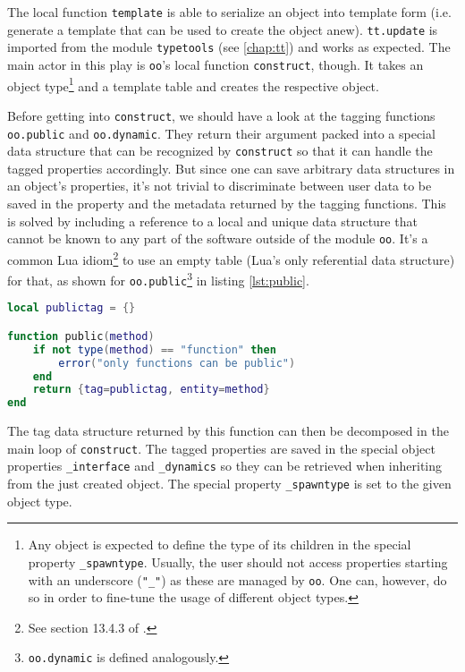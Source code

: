 The local function \texttt{template} is able to serialize an object into template form (i.e. generate a template that can be used to create the object anew). \texttt{tt.update} is imported from the module \texttt{typetools} (see \ref{chap:tt}) and works as expected. The main actor in this play is \texttt{oo}'s local function \texttt{construct}, though. It takes an object type\footnote{Any object is expected to define the type of its children in the special property \texttt{\_spawntype}. Usually, the user should not access properties starting with an underscore (\texttt{"\_"}) as these are managed by \texttt{oo}. One can, however, do so in order to fine-tune the usage of different object types.} and a template table and creates the respective object.

Before getting into \texttt{construct}, we should have a look at the tagging functions \texttt{oo.public} and \texttt{oo.dynamic}. They return their argument packed into a special data structure that can be recognized by \texttt{construct} so that it can handle the tagged properties accordingly. But since one can save arbitrary data structures in an object's properties, it's not trivial to discriminate between user data to be saved in the property and the metadata returned by the tagging functions. This is solved by including a reference to a local and unique data structure that cannot be known to any part of the software outside of the module \texttt{oo}. It's a common Lua idiom\footnote{See section 13.4.3 of \cite{Ierusalimschy2006}.} to use an empty table (Lua's only referential data structure) for that, as shown for \texttt{oo.public}\footnote{\texttt{oo.dynamic} is defined analogously.} in listing \ref{lst:public}.

\begin{lstlisting}[language=lua, caption={The definition of \texttt{oo.public} from \texttt{"oo.lua"}}, label=lst:public, name=lst:public]
local publictag = {}

function public(method)
    if not type(method) == "function" then
        error("only functions can be public")
    end
    return {tag=publictag, entity=method}
end
\end{lstlisting}

The tag data structure returned by this function can then be decomposed in the main loop of \texttt{construct}. The tagged properties are saved in the special object properties \texttt{\_interface} and \texttt{\_dynamics} so they can be retrieved when inheriting from the just created object. The special property \texttt{\_spawntype} is set to the given object type.

